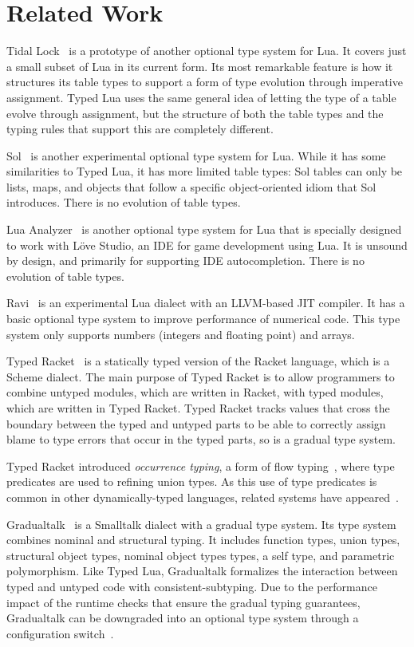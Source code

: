 \documentclass[10pt]{sigplanconf}
\begin{document}
\section{Related Work}
\label{sec:related}

Tidal Lock~\cite{tidallock} is a prototype of another optional type system for Lua. It covers just a small subset of Lua
in its current form. Its most remarkable feature is
how it structures its table types to support a form of type
evolution through imperative assignment. Typed Lua uses
the same general idea of letting the type of a table evolve
through assignment, but the structure of both the table types
and the typing rules that support this are completely different.

Sol~\cite{sol} is another experimental optional type system
for Lua. While it has some similarities to Typed Lua, it
has more limited table types: Sol tables can only be lists,
maps, and objects that follow a specific object-oriented
idiom that Sol introduces. There is no evolution of table
types.

Lua Analyzer~\cite{luaanalyzer} is another optional type
system for Lua that is specially designed to work with
Löve Studio, an IDE for game development using Lua.
It is unsound by design, and primarily for supporting
IDE autocompletion. There is no evolution of table types.

Ravi~\cite{ravi} is an experimental Lua dialect
with an LLVM-based JIT compiler. It has a basic
optional type system to improve performance
of numerical code. This type system only supports
numbers (integers and floating point) and arrays.

Typed Racket~\cite{tobin-hochstadt2008ts} is a statically typed version of the Racket language, which is a Scheme dialect.
The main purpose of Typed Racket is to allow programmers to combine untyped modules, which are written in Racket, with typed modules, which are written in Typed Racket. Typed Racket tracks
values that cross the boundary between the typed and
untyped parts to be able to correctly assign blame to type
errors that occur in the typed parts, so is a gradual type
system.

Typed Racket introduced {\em occurrence typing}, a form of
flow typing~\cite{tobin-hochstadt2010ltu}, where type
predicates are used to refining union types.
As this use of type predicates is common in other
dynamically-typed languages, related systems
have appeared~\cite{guha2011tlc,winther2011gtp,pearce2013ccf}.

Gradualtalk~\cite{allende2013gts} is a Smalltalk dialect 
with a gradual type system. Its type system combines
nominal and structural typing.
It includes function types, union types, structural object types,
nominal object types types, a self type, and parametric polymorphism. Like Typed Lua, Gradualtalk formalizes the
interaction between typed and untyped code with consistent-subtyping. Due to the performance impact of
the runtime checks that ensure the gradual typing guarantees,
Gradualtalk can be downgraded into an optional type system
through a configuration switch~\cite{allende2013cis}.
\end{document}
